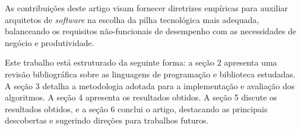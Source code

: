 As contribuições deste artigo visam fornecer diretrizes empíricas para auxiliar arquitetos de \textit{software} na escolha da pilha tecnológica mais adequada, balanceando os requisitos não-funcionais de desempenho com as necessidades de negócio e produtividade.

Este trabalho está estruturado da seguinte forma: a seção 2 apresenta uma revisão bibliográfica sobre as linguagens de programação e biblioteca estudadas. A seção 3 detalha a metodologia adotada para a implementação e avaliação dos algoritmos. A seção 4 apresenta os resultados obtidos. A seção 5 discute os resultados obtidos, e a seção 6 conclui o artigo, destacando as principais descobertas e sugerindo direções para trabalhos futuros.